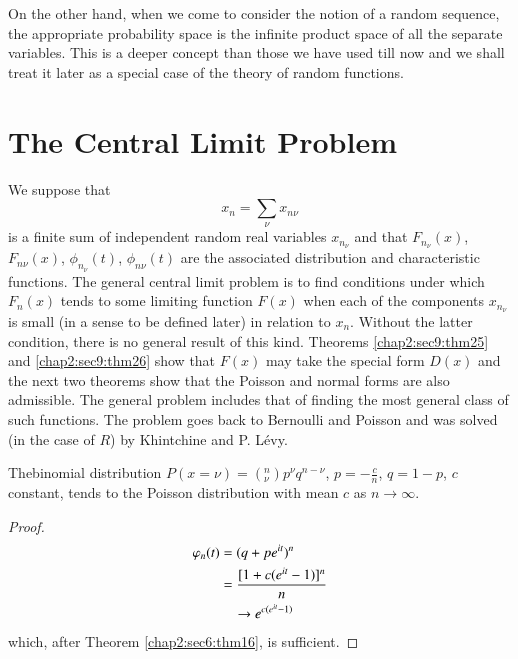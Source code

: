  
 On the other hand, when we come to consider  the notion of a random
 sequence, the appropriate probability space is the infinite  
 product space of all the separate variables. This is a deeper
 concept than those we have used till now and we shall treat  it later
 as a special case of the theory of random functions.
 
\section{The Central Limit Problem}\label{chap2:sec10}
 
  We  suppose  that 
   $$
    x_{n} =  \sum \limits_{\nu} x_{n\nu}
   $$
is a finite sum of independent  random  real variables $x_{n_\nu}$ and
that $F_{n_\nu} (x)$, $F_{n\nu} (x)$, $\phi_{n_\nu}(t)$, $\phi_{n{\nu}}
(t)$ are  the  associated distribution and characteristic
functions. The  general  central limit problem is to find 
 conditions under which $F_{n}(x)$  tends  to some limiting function
 $F(x)$  when each of the components  $x_{n_\nu}$  is small  
(in a sense  to be  defined later)  in  relation to $x_{n} $.  Without the
 latter condition, there is no general result of this kind. 
Theorems  \ref{chap2:sec9:thm25} and \ref{chap2:sec9:thm26} show that $F(x)$  may take  the special  form $D(x)$
and the next  two theorems show that the Poisson and normal 
forms  are  also admissible. The  general problem includes that  of
finding  the most  general class of such functions. The problem goes  
back to Bernoulli  and Poisson  and  was solved (in the case  of $R$)
by Khintchine and P. L\'evy. 

\begin{theorem}[Poisson]\label{chap2:sec10:thm27} %
  The\pageoriginale binomial distribution $P(x = \nu) = (^n_\nu) p^{\nu} q^{n-\nu}$,
  $p= - \frac{c}{n}$, $q=1-p$, $c$ constant, tends to the Poisson distribution
  with mean $c$ as $n \rightarrow \infty$. 
\end{theorem}

\begin{proof}
  \begin{align*}
    \varphi_n (t) & = (q + pe^{it})^n\\
    & = \frac{{\it [} 1 + c(e^{it} -1) {\it ]^n}}{n}\\
    & \quad \rightarrow e^{c(e^{it} -1)}
  \end{align*}
  which, after Theorem \ref{chap2:sec6:thm16}, is sufficient.	
\end{proof}


